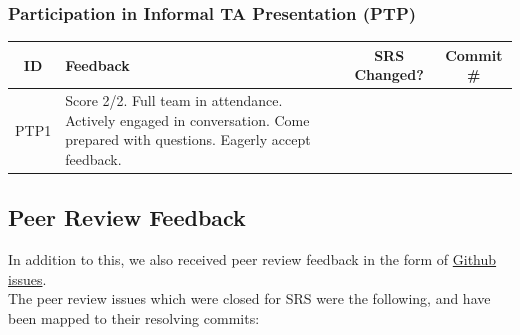 \documentclass{article}
\begin{document}
\subsubsection{Participation in Informal TA Presentation (PTP)}
\begin{table}[h!]
\centering
\begin{tabular}{|c|p{8cm}|c|c|}
\hline
\textbf{ID} & \textbf{Feedback} & \textbf{SRS Changed?} & \textbf{Commit \#} \\ \hline
PTP1 & Score 2/2. Full team in attendance. Actively engaged in conversation. Come prepared with questions. Eagerly accept feedback. & & \\ \hline
\end{tabular}
\end{table}

\subsection{Peer Review Feedback}

In addition to this, we also received peer review feedback in the form of 
\href{https://github.com/The-Crazy-Four-Games/Crazy_1-0s_Game/issues?q=is%3Aissue%20peer%20review%20srs%20milestone%3AD11-Rev1}{Github issues}.\\
The peer review issues which were closed for SRS were the following, and have been mapped to their resolving commits:
\end{document}
